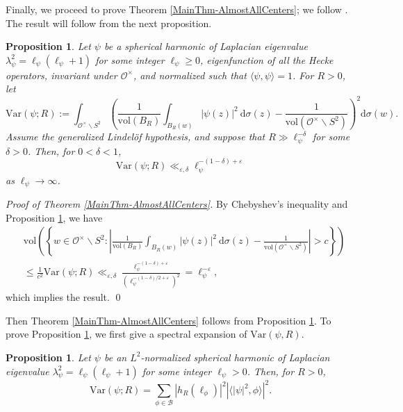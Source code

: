 \documentclass[11pt]{amsart}
\newtheorem{proposition}[theorem]{Proposition}
\theoremstyle{definition}
\begin{document}
Finally, we proceed to prove Theorem \ref{MainThm-AlmostAllCenters}; we follow \cite[\S 5.1]{HumphriesPhD}. The result will follow from the next proposition.

\begin{proposition}\label{BoundsVariance}
Let $\psi$ be a spherical harmonic of Laplacian eigenvalue $\lambda_{\psi}^2 = \ell_{\psi}(\ell_{\psi}+1)$ for some integer $\ell_{\psi}\geq 0$, eigenfunction of all the Hecke operators, invariant under $\mathcal{O}^{\times}$, and normalized such that $\langle \psi, \psi\rangle = 1$. For $R>0$, let $$\mathrm{Var}(\psi; R) := \int_{\mathcal{O}^{\times} \backslash S^2} \left( \frac{1}{\mathrm{vol}(B_R)} \int_{B_R(w)} |\psi(z)|^2 \: \mathrm{d}\sigma(z) - \frac{1}{\mathrm{vol}(\mathcal{O}^{\times} \backslash S^2)} \right)^2 \mathrm{d}\sigma(w).$$ Assume the generalized Lindelöf hypothesis, and suppose that $R \gg \ell_{\psi}^{-\delta}$ for some $\delta >0$. Then, for $0<\delta < 1$, $$ \mathrm{Var}(\psi; R) \ll_{\varepsilon, \delta} \ell_{\psi}^{-(1-\delta)+\varepsilon}$$ as $\ell_{\psi}\rightarrow \infty$.
\end{proposition}

\noindent \textit{Proof of Theorem \ref{MainThm-AlmostAllCenters}.} By Chebyshev's inequality and Proposition \ref{BoundsVariance}, we have 
\begin{align*}
    &\mathrm{vol}\left( \left\{ w\in \mathcal{O}^{\times} \backslash S^2 : \left| \frac{1}{\mathrm{vol}(B_R)} \int_{B_R(w)} |\psi(z)|^2 \: \mathrm{d}\sigma(z) - \frac{1}{\mathrm{vol}(\mathcal{O}^{\times} \backslash S^2)} \right| > c \right\} \right) \\
    &\leq \frac{1}{c^2} \mathrm{Var}(\psi; R) \ll_{\varepsilon, \delta} \frac{\ell_{\psi}^{-(1-\delta)+\varepsilon}}{\left(\ell_{\psi}^{-(1-\delta)/2 + \varepsilon} \right)^2} = \ell_{\psi}^{-\varepsilon},
\end{align*}
which implies the result. \hfill \qed

\vspace{0.1cm}
Then Theorem \ref{MainThm-AlmostAllCenters} follows from Proposition \ref{BoundsVariance}. To prove Proposition \ref{BoundsVariance}, we first give a spectral expansion of $\mathrm{Var}(\psi,R)$.

\begin{proposition}\label{VarianceFormula}
Let $\psi$ be an $L^2$-normalized spherical harmonic of Laplacian eigenvalue $\lambda_{\psi}^2 = \ell_{\psi}(\ell_{\psi}+1)$ for some integer $\ell_{\psi}>0$. Then, for $R>0$, $$\mathrm{Var}(\psi;R) = \sum_{\phi \in \mathcal{B}} |h_R(\ell_{\phi})|^2 \left| \langle |\psi|^2, \phi \rangle \right|^2.$$
\end{proposition}
\end{document}
